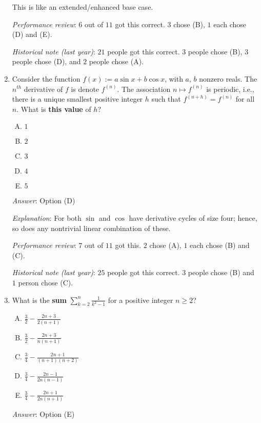 \documentclass[10pt]{amsart}
\begin{document}
\begin{enumerate}
  This is like an extended/enhanced base case.

  {\em Performance review}: $6$ out of $11$ got this correct. $3$
  chose (B), $1$ each chose (D) and (E).

  {\em Historical note (last year)}: $21$ people got this correct. $3$
  people chose (B), $3$ people chose (D), and $2$ people chose (A).
\item Consider the function $f(x) := a \sin x + b \cos x$, with $a$,
  $b$ nonzero reals. The $n^{th}$ derivative of $f$ is denote
  $f^{(n)}$. The association $n \mapsto f^{(n)}$ is periodic, i.e.,
  there is a unique smallest positive integer $h$ such that $f^{(n +
  h)} = f^{(n)}$ for all $n$. What is {\bf this value} of $h$?

  \begin{enumerate}[(A)]
  \item $1$
  \item $2$
  \item $3$
  \item $4$
  \item $5$
  \end{enumerate}

  {\em Answer}: Option (D)

  {\em Explanation}: For both $\sin$ and $\cos$ have derivative cycles
  of size four; hence, so does any nontrivial linear combination of
  these.

  {\em Performance review}: $7$ out of $11$ got this. $2$ chose (A),
  $1$ each chose (B) and (C).

  {\em Historical note (last year)}: $25$ people got this correct. $3$
  people chose (B) and $1$ person chose (C).

\item What is the {\bf sum} $\sum_{k=2}^n \frac{1}{k^2 - 1}$ for a
  positive integer $n \ge 2$?

  \begin{enumerate}[(A)]
  \item $\frac{3}{2} - \frac{2n + 3}{2(n+1)}$
  \item $\frac{3}{2} - \frac{2n + 3}{n(n+1)}$
  \item $\frac{3}{4} - \frac{2n + 1}{(n + 1)(n+2)}$
  \item $\frac{3}{4} - \frac{2n - 1}{2n(n-1)}$
  \item $\frac{3}{4} - \frac{2n + 1}{2n(n+1)}$
  \end{enumerate}

  {\em Answer}: Option (E)


\end{enumerate}
\end{document}
